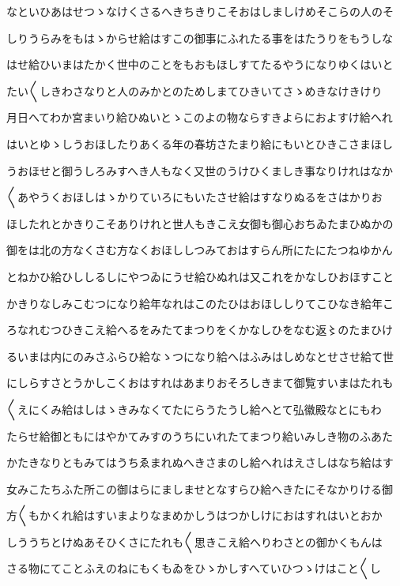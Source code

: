 \documentclass[a4paper,11pt,landscape]{ltjtarticle}
\begin{document}
なといひあはせつゝなけくさるへきちきりこそおはしましけめそこらの人のそ
\par\medskip
しりうらみをもはゝからせ給はすこの御事にふれたる事をはたうりをもうしな
\par\medskip
はせ給ひいまはたかく世中のことをもおもほしすてたるやうになりゆくはいと
\par\medskip
たい〱しきわさなりと人のみかとのためしまてひきいてさゝめきなけきけり
\par\medskip
月日へてわか宮まいり給ひぬいとゝこのよの物ならすきよらにおよすけ給へれ
\par\medskip
はいとゆゝしうおほしたりあくる年の春坊さたまり給にもいとひきこさまほし
\par\medskip
うおほせと御うしろみすへき人もなく又世のうけひくましき事なりけれはなか
\par\medskip
〱あやうくおほしはゝかりていろにもいたさせ給はすなりぬるをさはかりお
\par\medskip
ほしたれとかきりこそありけれと世人もきこえ女御も御心おちゐたまひぬかの
\par\medskip
御をは北の方なくさむ方なくおほししつみておはすらん所にたにたつねゆかん
\par\medskip
とねかひ給ひししるしにやつゐにうせ給ひぬれは又これをかなしひおほすこと
\par\medskip
かきりなしみこむつになり給年なれはこのたひはおほししりてこひなき給年こ
\par\medskip
ろなれむつひきこえ給へるをみたてまつりをくかなしひをなむ返〻のたまひけ
\par\medskip
るいまは内にのみさふらひ給なゝつになり給へはふみはしめなとせさせ給て世
\par\medskip
にしらすさとうかしこくおはすれはあまりおそろしきまて御覧すいまはたれも
\par\medskip
〱えにくみ給はしはゝきみなくてたにらうたうし給へとて弘徽殿なとにもわ
\par\medskip
たらせ給御ともにはやかてみすのうちにいれたてまつり給いみしき物のふあた
\par\medskip
かたきなりともみてはうちゑまれぬへきさまのし給へれはえさしはなち給はす
\par\medskip
女みこたちふた所この御はらにましませとなすらひ給へきたにそなかりける御
\par\medskip
方〱もかくれ給はすいまよりなまめかしうはつかしけにおはすれはいとおか
\par\medskip
しううちとけぬあそひくさにたれも〱思きこえ給へりわさとの御かくもんは
\par\medskip
さる物にてことふえのねにもくもゐをひゝかしすへていひつゝけはこと〱し
\end{document}
